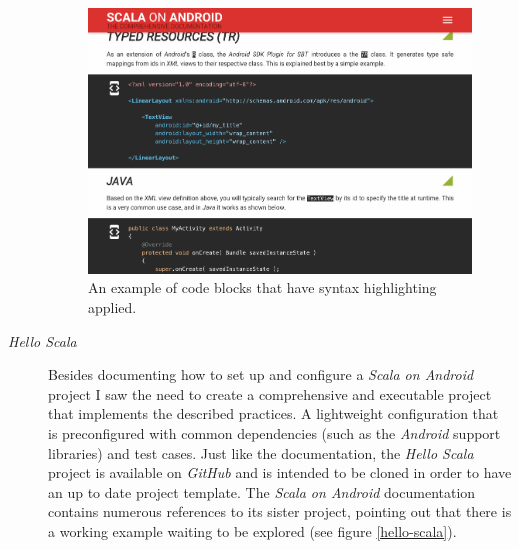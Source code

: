 \begin{description}
	\begin{figure}[]
		\includegraphics[width=\textwidth]{asset/syntax-highlighting.png}
		\caption{An example of code blocks that have syntax highlighting applied.}
		\label{syntax-highlighting}
	\end{figure}

	\item[\textit{Hello Scala}]\hfill

	Besides documenting how to set up and configure a \textit{Scala on Android} project I saw the need to create a comprehensive and executable project that implements the described practices. A lightweight configuration that is preconfigured with common dependencies (such as the \textit{Android} support libraries) and test cases. Just like the documentation, the \textit{Hello Scala} project is available on \textit{GitHub} and is intended to be cloned in order to have an up to date project template. The \textit{Scala on Android} documentation contains numerous references to its sister project, pointing out that there is a working example waiting to be explored (see figure \ref{hello-scala}).


\end{description}
